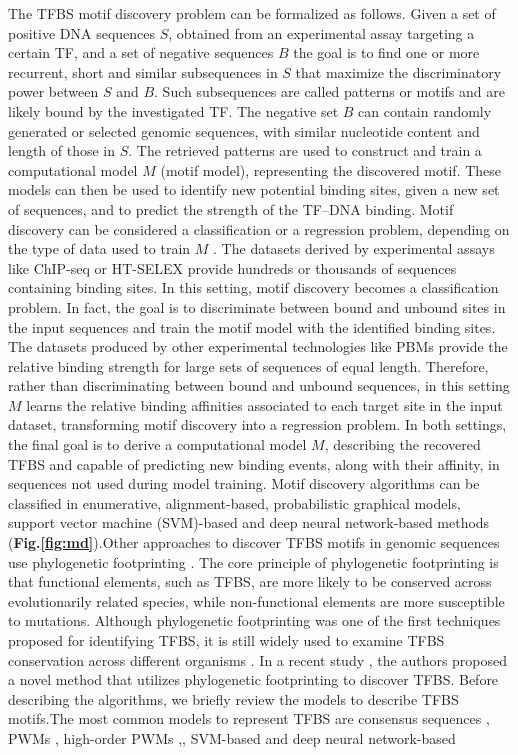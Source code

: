 \documentclass[a4paper, titlepage, openright]{book}
\begin{document}
The TFBS motif discovery problem can be formalized as follows. Given a set of positive DNA sequences $S$, obtained from an experimental assay targeting a certain TF, and a set of negative sequences $B$ the goal is to find one or more recurrent, short and similar subsequences in $S$ that maximize the discriminatory power between $S$ and $B$. Such subsequences are called patterns or motifs and are likely bound by the investigated TF.  The negative set $B$ can contain randomly generated or selected genomic sequences, with similar nucleotide content and length of those in $S$. The retrieved patterns are used to construct and train a computational model $M$ (motif model), representing the discovered motif. These models can then be used to identify new potential binding sites, given a new set of sequences, and to predict the strength of the TF–DNA binding. Motif discovery can be considered a classification or a regression problem, depending on the type of data used to train $M$ \citep{tognon2023survey}.  The datasets derived by experimental assays like ChIP-seq or HT-SELEX provide hundreds or thousands of sequences containing binding sites. In this setting, motif discovery becomes a classification problem. In fact, the goal is to discriminate between bound and unbound sites in the input sequences and train the motif model with the identified binding sites. The datasets produced by other experimental technologies like PBMs provide the relative binding strength for large sets of sequences of equal length. Therefore, rather than discriminating between bound and unbound sequences, in this setting $M$ learns the relative binding affinities associated to each target site in the input dataset, transforming motif discovery into a regression problem. In both settings, the final goal is to derive a computational model $M$, describing the recovered TFBS and capable of predicting new binding events, along with their affinity, in sequences not used during model training. Motif discovery algorithms can be classified in enumerative, alignment-based, probabilistic graphical models, support vector machine (SVM)-based and deep neural network-based methods (\textbf{Fig.\ref{fig:md}}).Other approaches to discover TFBS motifs in genomic sequences use phylogenetic footprinting \citep{mccue2001phylogenetic,blanchette2002discovery}. The core principle of phylogenetic footprinting is that functional elements, such as TFBS, are more likely to be conserved across evolutionarily related species, while non-functional elements are more susceptible to mutations. Although phylogenetic footprinting was one of the first techniques proposed for identifying TFBS, it is still widely used to examine TFBS conservation across different organisms \citep{balazadeh2011ors1, xu2012cis,katara2012phylogenetic}. In a recent study \citep{glenwinkel2014targetortho},  the authors proposed a novel method that utilizes phylogenetic footprinting to discover TFBS. Before describing the algorithms, we briefly review the models to describe TFBS motifs.The most common models to represent TFBS are consensus sequences  \citep{day1992critical}, PWMs \citep{stormo2000dna,stormo2013modeling},  high-order PWMs \citep{siddharthan2010dinucleotide,korhonen2017fast},, SVM-based  \citep{gorkin2012integration} and deep neural network-based  
\end{document}
